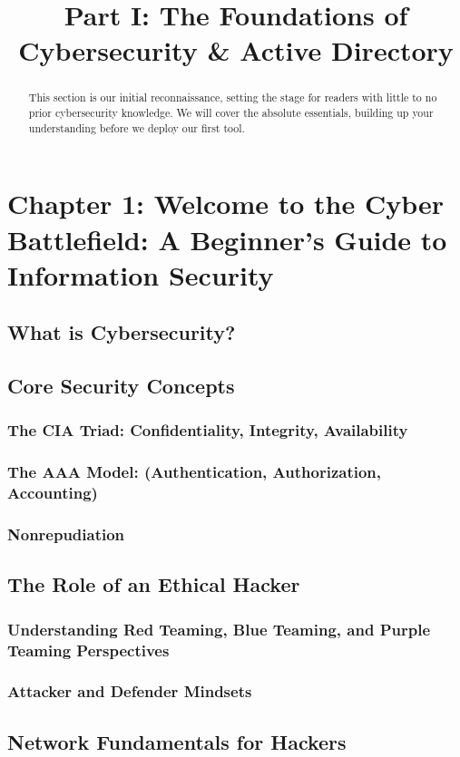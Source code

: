 \documentclass{article}
\title{Part I: The Foundations of Cybersecurity \& Active Directory}
\begin{document}
\maketitle

\begin{abstract}
This section is our initial reconnaissance, setting the stage for readers with little to no prior cybersecurity knowledge. We will cover the absolute essentials, building up your understanding before we deploy our first tool.
\end{abstract}


\section{Chapter 1: Welcome to the Cyber Battlefield: A Beginner's Guide to Information Security}
\subsection{What is Cybersecurity?}
\subsection{Core Security Concepts}
\subsubsection{The CIA Triad: Confidentiality, Integrity, Availability}
\subsubsection{The AAA Model: (Authentication, Authorization, Accounting)}
\subsubsection{Nonrepudiation}
\subsection{The Role of an Ethical Hacker}
\subsubsection{Understanding Red Teaming, Blue Teaming, and Purple Teaming Perspectives}
\subsubsection{Attacker and Defender Mindsets}
\subsection{Network Fundamentals for Hackers}
\end{document}
